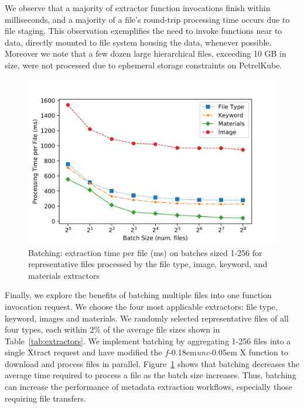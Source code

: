 \documentclass[sigconf]{acmart}
\newcommand{\tyler}[1]{}
\newcommand{\kyle}[1]{}
\newcommand{\tyler}[1]{{\textcolor{cyan}{ tyler: #1 }}}
\newcommand{\kyle}[1]{{\textcolor{purple}{ Kyle: #1 }}}
\newcommand{\name}{Xtract}
\newcommand{\funcx}{$f$\kern-0.18em\emph{unc}\kern-0.05em X}
\begin{document}
We observe that a majority of extractor function invocations 
finish within milliseconds, and a majority of a file's round-trip 
processing time occurs due to file staging. This observation exemplifies
the need to
invoke functions near to data, directly mounted to file system 
housing the data, whenever possible.  Moreover we note that a few dozen large hierarchical files, 
exceeding 10 GB in size, were not processed due to ephemeral storage constraints on PetrelKube.

\begin{figure}
	\includegraphics[scale=0.6]{figs/batch-times.jpg}
	\caption{Batching: extraction time per file (ms) on batches sized 1-256 for representative files processed by the 
	file type, image, keyword, and materials extractors}
    \label{fig:batching}
\end{figure}

Finally, we explore the benefits of batching multiple files 
into one function invocation request. We choose the four most applicable 
extractors: file type, keyword, images and materials. 
We randomly selected representative files of all four types, each within 2\% of the average
file sizes shown in Table~\ref{tab:extractors}. 
We implement batching by aggregating 1-256 files into a single \name{} request and
have modified the \funcx{} function to download and process files in parallel. 
Figure~\ref{fig:batching} shows that batching decreases the average time 
required to process a file as the batch size increases. 
Thus, batching can increase the performance of 
metadata extraction workflows, especially those requiring file transfers. 
\end{document}
